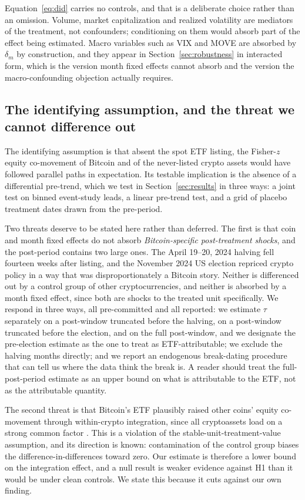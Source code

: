 \documentclass[12pt,a4paper]{article}
\begin{document}
Equation~\eqref{eq:did} carries no controls, and that is a deliberate choice rather than an omission. Volume, market capitalization and realized volatility are mediators of the treatment, not confounders; conditioning on them would absorb part of the effect being estimated. Macro variables such as VIX and MOVE are absorbed by $\delta_m$ by construction, and they appear in Section~\ref{sec:robustness} in interacted form, which is the version month fixed effects cannot absorb and the version the macro-confounding objection actually requires.

\subsection{The identifying assumption, and the threat we cannot difference out}

The identifying assumption is that absent the spot ETF listing, the Fisher-$z$ equity co-movement of Bitcoin and of the never-listed crypto assets would have followed parallel paths in expectation. Its testable implication is the absence of a differential pre-trend, which we test in Section~\ref{sec:results} in three ways: a joint test on binned event-study leads, a linear pre-trend test, and a grid of placebo treatment dates drawn from the pre-period.

Two threats deserve to be stated here rather than deferred. The first is that coin and month fixed effects do not absorb \emph{Bitcoin-specific post-treatment shocks}, and the post-period contains two large ones. The April 19--20, 2024 halving fell fourteen weeks after listing, and the November 2024 US election repriced crypto policy in a way that was disproportionately a Bitcoin story. Neither is differenced out by a control group of other cryptocurrencies, and neither is absorbed by a month fixed effect, since both are shocks to the treated unit specifically. We respond in three ways, all pre-committed and all reported: we estimate $\tau$ separately on a post-window truncated before the halving, on a post-window truncated before the election, and on the full post-window, and we designate the pre-election estimate as the one to treat as ETF-attributable; we exclude the halving months directly; and we report an endogenous break-dating procedure that can tell us where the data think the break is. A reader should treat the full-post-period estimate as an upper bound on what is attributable to the ETF, not as the attributable quantity.

The second threat is that Bitcoin's ETF plausibly raised other coins' equity co-movement through within-crypto integration, since all cryptoassets load on a strong common factor \citep{hu2019cryptocurrencies}. This is a violation of the stable-unit-treatment-value assumption, and its direction is known: contamination of the control group biases the difference-in-differences toward zero. Our estimate is therefore a lower bound on the integration effect, and a null result is weaker evidence against H1 than it would be under clean controls. We state this because it cuts against our own finding.
\end{document}
